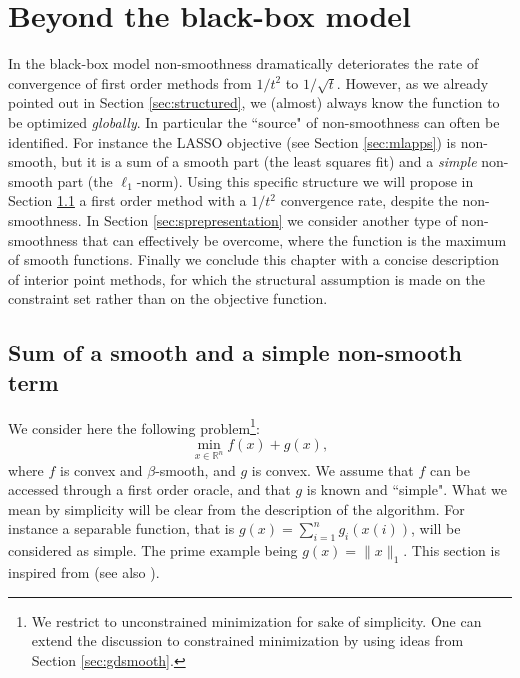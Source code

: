 \documentclass[openany]{now}
\newcommand{\R}{\mathbb{R}}
\begin{document}
\chapter{Beyond the black-box model}
\label{beyond}
In the black-box model non-smoothness dramatically deteriorates the rate of convergence of first order methods from $1/t^2$ to $1/\sqrt{t}$. However, as we already pointed out in Section \ref{sec:structured}, we (almost) always know the function to be optimized {\em globally}. In particular the ``source" of non-smoothness can often be identified. For instance the LASSO objective (see Section \ref{sec:mlapps}) is non-smooth, but it is a sum of a smooth part (the least squares fit) and a {\em simple} non-smooth part (the $\ell_1$-norm). Using this specific structure we will propose in Section \ref{sec:simplenonsmooth} a first order method with a $1/t^2$ convergence rate, despite the non-smoothness. In Section \ref{sec:sprepresentation} we consider another type of non-smoothness that can effectively be overcome, where the function is the maximum of smooth functions. Finally we conclude this chapter with a concise description of interior point methods, for which the structural assumption is made on the constraint set rather than on the objective function.

\section{Sum of a smooth and a simple non-smooth term} \label{sec:simplenonsmooth}
We consider here the following problem\footnote{We restrict to unconstrained minimization for sake of simplicity. One can extend the discussion to constrained minimization by using ideas from Section \ref{sec:gdsmooth}.}:
$$\min_{x \in \R^n} f(x) + g(x) ,$$
where $f$ is convex and $\beta$-smooth, and $g$ is convex. We assume that $f$ can be accessed through a first order oracle, and that $g$ is known and ``simple". What we mean by simplicity will be clear from the description of the algorithm. For instance a separable function, that is $g(x) = \sum_{i=1}^n g_i(x(i))$, will be considered as simple. The prime example being $g(x) = \|x\|_1$. This section is inspired from \cite{BT09} (see also \cite{Nes07, WNF09}).
\end{document}
